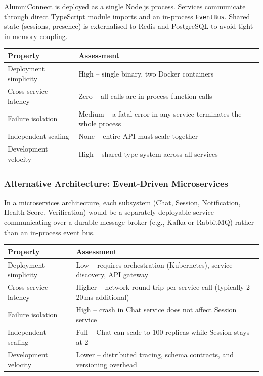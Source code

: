 \documentclass[12pt,a4paper]{article}
\begin{document}
AlumniConnect is deployed as a single Node.js process. Services communicate through direct TypeScript module imports and an in-process \texttt{EventBus}. Shared state (sessions, presence) is externalised to Redis and PostgreSQL to avoid tight in-memory coupling.

\begin{center}
\begin{tabular}{@{}p{4cm} p{8.5cm}@{}}
\toprule
\textbf{Property} & \textbf{Assessment} \\
\midrule
Deployment simplicity & High -- single binary, two Docker containers \\
Cross-service latency & Zero -- all calls are in-process function calls \\
Failure isolation & Medium -- a fatal error in any service terminates the whole process \\
Independent scaling & None -- entire API must scale together \\
Development velocity & High -- shared type system across all services \\
\bottomrule
\end{tabular}
\end{center}

\subsubsection{Alternative Architecture: Event-Driven Microservices}

In a microservices architecture, each subsystem (Chat, Session, Notification, Health Score, Verification) would be a separately deployable service communicating over a durable message broker (e.g., Kafka or RabbitMQ) rather than an in-process event bus.

\begin{center}
\begin{tabular}{@{}p{4cm} p{8.5cm}@{}}
\toprule
\textbf{Property} & \textbf{Assessment} \\
\midrule
Deployment simplicity & Low -- requires orchestration (Kubernetes), service discovery, API gateway \\
Cross-service latency & Higher -- network round-trip per service call (typically 2--20\,ms additional) \\
Failure isolation & High -- crash in Chat service does not affect Session service \\
Independent scaling & Full -- Chat can scale to 100 replicas while Session stays at 2 \\
Development velocity & Lower -- distributed tracing, schema contracts, and versioning overhead \\
\bottomrule
\end{tabular}
\end{center}
\end{document}

